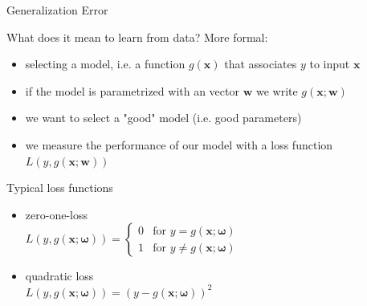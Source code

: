 \documentclass[xcolor=pdftex,dvipsnames,table]{beamer}
\begin{document}
\begin{frame}{Generalization Error}
	\par
	\scriptsize
	\textcolor{NavyBlue}{What does it mean to learn from data? More formal: \\}
	\begin{itemize}
		\item selecting a model, i.e. a function $g(\mathbf{x})$ that associates $y$ to input $\mathbf{x}$
		\item if the model is parametrized with an vector $\mathbf{w}$ we write $g(\mathbf{x}; \mathbf{w})$
		\item we want to select a "good" model (i.e. good parameters)%
		\item we measure the performance of our model with a loss function $L(y, g(\mathbf{x}; \mathbf{w}))$
	\end{itemize}
	\textcolor{NavyBlue}{Typical loss functions \\}
	\begin{itemize}
	 	\item zero-one-loss\\$L(y,g(\mathbf{x};\mathbf{\omega})) =  \begin{cases}0 & \text{for } y=g(\mathbf{x};\mathbf{\omega})\\1 & \text{for } y\ne g(\mathbf{x};\mathbf{\omega}) \end{cases}$
	 	\item quadratic loss \\ $L(y,g(\mathbf{x};\mathbf{\omega})) = (y-g(\mathbf{x};\mathbf{\omega}))^2$
	 \end{itemize}
\end{frame}
\end{document}
